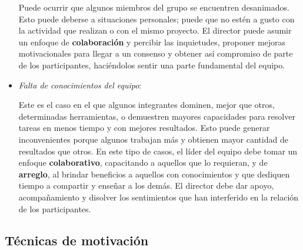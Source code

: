\begin{itemize}
Puede ocurrir que algunos miembros del grupo se encuentren desanimados.
Esto puede deberse a situaciones personales; puede que no estén a gusto con la actividad que realizan o con el mismo proyecto.
El director puede asumir un enfoque de \textbf{colaboración} y percibir las inquietudes, proponer mejoras motivacionales para llegar a un consenso y obtener así compromiso de parte de los participantes, haciéndolos sentir una parte fundamental del equipo.

\item \textit{Falta de conocimientos del equipo}:

Este es el caso en el que algunos integrantes dominen, mejor que otros, determinadas herramientas, o demuestren mayores capacidades para resolver tareas en menos tiempo y con mejores resultados.
Esto puede generar inconvenientes porque algunos trabajan más y obtienen mayor cantidad de resultados que otros.
En este tipo de casos, el líder del equipo debe tomar un enfoque \textbf{colaborativo}, capacitando a aquellos que lo requieran, y de \textbf{arreglo}, al brindar beneficios a aquellos con conocimientos y que dediquen tiempo a compartir y enseñar a los demás.
El director debe dar apoyo, acompañamiento y disolver los sentimientos que han interferido en la relación de los participantes.


\end{itemize}

\newpage

\subsection{Técnicas de motivación}

